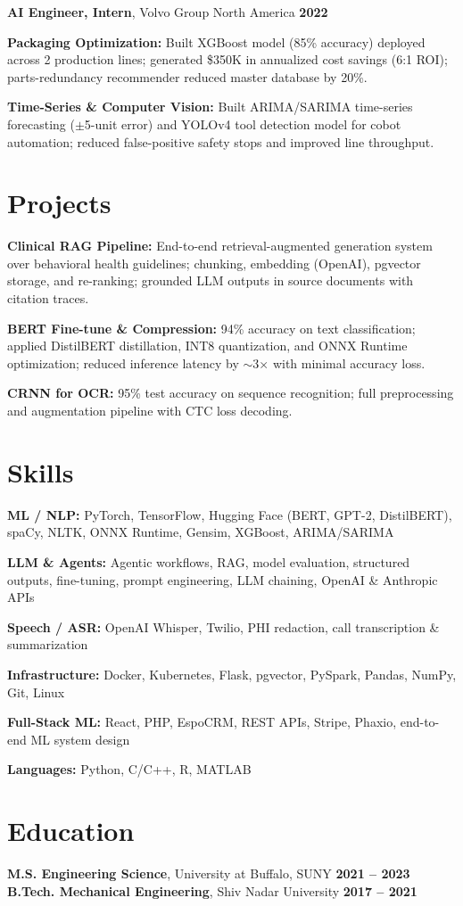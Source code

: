\documentclass[letterpaper,10pt]{article}
\newcommand{\role}[3]{%
  \vspace{2pt}
  \textbf{#1}, #2 \hfill \textbf{#3}\\
}
\newcommand{\entry}[2]{\item \textbf{#1:} #2}
\begin{document}
\role{AI Engineer, Intern}{Volvo Group North America}{2022}
\begin{tightitemize}
  \entry{Packaging Optimization}{Built XGBoost model (85\% accuracy) deployed across 2 production lines; generated \$350K in annualized cost savings (6:1 ROI); parts-redundancy recommender reduced master database by 20\%.}
  \entry{Time-Series \& Computer Vision}{Built ARIMA/SARIMA time-series forecasting ($\pm$5-unit error) and YOLOv4 tool detection model for cobot automation; reduced false-positive safety stops and improved line throughput.}
\end{tightitemize}

\section{Projects}
\begin{tightitemize}
  \entry{Clinical RAG Pipeline}{End-to-end retrieval-augmented generation system over behavioral health guidelines; chunking, embedding (OpenAI), pgvector storage, and re-ranking; grounded LLM outputs in source documents with citation traces.}
  \entry{BERT Fine-tune \& Compression}{94\% accuracy on text classification; applied DistilBERT distillation, INT8 quantization, and ONNX Runtime optimization; reduced inference latency by $\sim$3$\times$ with minimal accuracy loss.}
  \entry{CRNN for OCR}{95\% test accuracy on sequence recognition; full preprocessing and augmentation pipeline with CTC loss decoding.}
\end{tightitemize}

\section{Skills}
\begin{tightitemize}
  \entry{ML / NLP}{PyTorch, TensorFlow, Hugging Face (BERT, GPT-2, DistilBERT), spaCy, NLTK, ONNX Runtime, Gensim, XGBoost, ARIMA/SARIMA}
  \entry{LLM \& Agents}{Agentic workflows, RAG, model evaluation, structured outputs, fine-tuning, prompt engineering, LLM chaining, OpenAI \& Anthropic APIs}
  \entry{Speech / ASR}{OpenAI Whisper, Twilio, PHI redaction, call transcription \& summarization}
  \entry{Infrastructure}{Docker, Kubernetes, Flask, pgvector, PySpark, Pandas, NumPy, Git, Linux}
  \entry{Full-Stack ML}{React, PHP, EspoCRM, REST APIs, Stripe, Phaxio, end-to-end ML system design}
  \entry{Languages}{Python, C/C++, R, MATLAB}
\end{tightitemize}

\section{Education}
\textbf{M.S. Engineering Science}, University at Buffalo, SUNY \hfill \textbf{2021 -- 2023}\\
\textbf{B.Tech. Mechanical Engineering}, Shiv Nadar University \hfill \textbf{2017 -- 2021}
\end{document}
